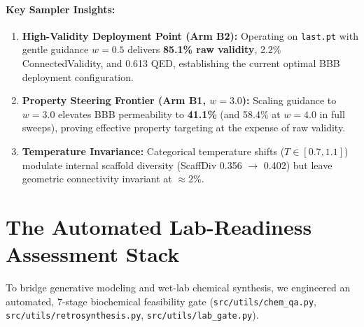 \documentclass[12pt, a4paper]{article}
\begin{document}
\paragraph{Key Sampler Insights:}
\begin{enumerate}[noitemsep]
    \item \textbf{High-Validity Deployment Point (Arm B2):} Operating on \texttt{last.pt} with gentle guidance $w=0.5$ delivers \textbf{85.1\% raw validity}, 2.2\% ConnectedValidity, and 0.613 QED, establishing the current optimal BBB deployment configuration.
    \item \textbf{Property Steering Frontier (Arm B1, $w=3.0$):} Scaling guidance to $w=3.0$ elevates BBB permeability to \textbf{41.1\%} (and 58.4\% at $w=4.0$ in full sweeps), proving effective property targeting at the expense of raw validity.
    \item \textbf{Temperature Invariance:} Categorical temperature shifts ($T \in [0.7, 1.1]$) modulate internal scaffold diversity (ScaffDiv 0.356 $\to$ 0.402) but leave geometric connectivity invariant at $\approx 2\%$.
\end{enumerate}

\section{The Automated Lab-Readiness Assessment Stack}
\label{sec:labready}

To bridge generative modeling and wet-lab chemical synthesis, we engineered an automated, 7-stage biochemical feasibility gate (\texttt{src/utils/chem\_qa.py}, \texttt{src/utils/retrosynthesis.py}, \texttt{src/utils/lab\_gate.py}).
\end{document}
